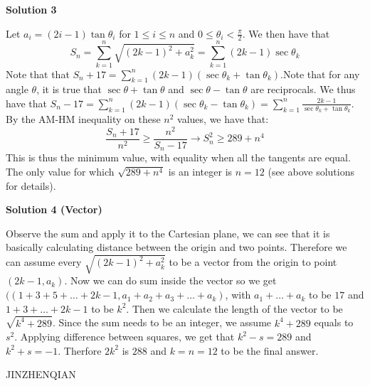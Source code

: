 \begin{enumerate}
 



\textbf{Solution 3}

Let $a_{i} = (2i - 1) \tan{\theta_{i}}$ for $1 \le i \le n$ and $0 \le \theta_{i} < \frac {\pi}{2}$. We then have that
 \[S_{n} = \sum_{k = 1}^{n}\sqrt {(2k - 1)^{2} + a_{k}^{2}} = \sum_{k = 1}^{n}(2k - 1) \sec{\theta_{k}}\]Note that that $S_{n} + 17 = \sum_{k = 1}^{n}(2k - 1)(\sec{\theta_{k}} + \tan{\theta_{k}})$.Note that for any angle $\theta$, it is true that $\sec{\theta} + \tan{\theta}$ and $\sec{\theta} - \tan{\theta}$ are reciprocals. We thus have that $S_{n} - 17 = \sum_{k = 1}^{n}(2k - 1)(\sec{\theta_{k}} - \tan{\theta_{k}}) = \sum_{k = 1}^{n}\frac {2k - 1}{\sec{\theta_{k}} + \tan{\theta_{k}}}$. By the AM-HM inequality on these $n^{2}$ values, we have that:
 \[\frac {S_{n} + 17}{n^{2}}\ge \frac {n^{2}}{S_{n} - 17}\rightarrow S_{n}^{2}\ge 289 + n^{4}\]This is thus the minimum value, with equality when all the tangents are equal. The only value for which $\sqrt {289 + n^{4}}$ is an integer is $n = 12$ (see above solutions for details).

 



\textbf{Solution 4 (Vector)}

Observe the sum and apply it to the Cartesian plane, we can see that it is basically calculating distance between the origin and two points. Therefore we can assume every $\sqrt{(2k-1)^2+a_k^2}$ to be a vector from the origin to point $(2k-1, a_k)$. Now we can do sum inside the vector so we get $((1+3+5+\ldots+2k-1,   a_1+a_2+a_3+\ldots+a_k)$, with $a_1+\ldots+a_k$ to be $17$ and $1+3+\ldots+2k-1$ to be $k^2$. Then we calculate the length of the vector to be $\sqrt{k^4+289}$. Since the sum needs to be an integer, we assume $k^4+289$ equals to $s^2$. Applying difference between squares, we get that $k^2-s=289$ and $k^2+s=-1$. Therfore $2k^2$ is $288$ and $k=n=12$ to be the final answer.

 JINZHENQIAN

 


\end{enumerate}